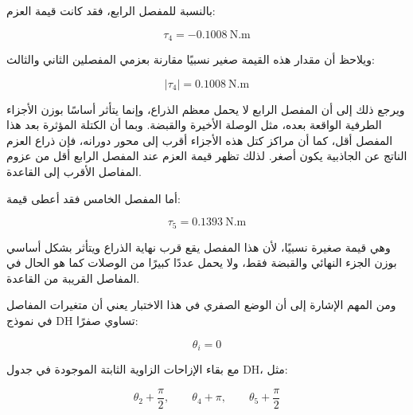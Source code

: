 بالنسبة للمفصل الرابع، فقد كانت قيمة العزم:

\[
\tau_4 = -0.1008\ \mathrm{N.m}
\]

ويلاحظ أن مقدار هذه القيمة صغير نسبيًا مقارنة بعزمي المفصلين الثاني والثالث:

\[
|\tau_4| = 0.1008\ \mathrm{N.m}
\]

ويرجع ذلك إلى أن المفصل الرابع لا يحمل معظم الذراع، وإنما يتأثر أساسًا بوزن الأجزاء الطرفية الواقعة بعده، مثل الوصلة الأخيرة والقبضة. وبما أن الكتلة المؤثرة بعد هذا المفصل أقل، كما أن مراكز كتل هذه الأجزاء أقرب إلى محور دورانه، فإن ذراع العزم الناتج عن الجاذبية يكون أصغر. لذلك تظهر قيمة العزم عند المفصل الرابع أقل من عزوم المفاصل الأقرب إلى القاعدة.

أما المفصل الخامس فقد أعطى قيمة:

\[
\tau_5 = 0.1393\ \mathrm{N.m}
\]

وهي قيمة صغيرة نسبيًا، لأن هذا المفصل يقع قرب نهاية الذراع ويتأثر بشكل أساسي بوزن الجزء النهائي والقبضة فقط، ولا يحمل عددًا كبيرًا من الوصلات كما هو الحال في المفاصل القريبة من القاعدة.

ومن المهم الإشارة إلى أن الوضع الصفري في هذا الاختبار يعني أن متغيرات المفاصل في نموذج DH تساوي صفرًا:

\[
\theta_i=0
\]

مع بقاء الإزاحات الزاوية الثابتة الموجودة في جدول DH، مثل:

\[
\theta_2+\frac{\pi}{2},
\qquad
\theta_4+\pi,
\qquad
\theta_5+\frac{\pi}{2}
\]